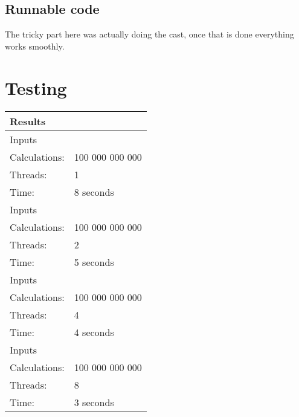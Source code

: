 

\subsection{Runnable code}
The tricky part here was actually doing the cast, once that is done everything works smoothly.




\section{Testing}



\newcommand{\rowhead}[1] {
\multicolumn{2}{l}{#1}\\
\hline
}

\newcommand{\row}[3] {
\hline
\rowcolor{gr1}
Inputs&\\
\hline \hline
\rowcolor{gr2}
Calculations: & #1 \\
\hline
\rowcolor{gr2}
Threads: & #2 \\
\hline
\rowcolor{gr2}
Time: & #3 \\
\hline \hline
}

\newcommand{\botrow}[3] {
\hline
\rowcolor{gr1}
Inputs&\\
\hline \hline
\rowcolor{gr2}
N = & #1 \\
\hline
\rowcolor{gr2}
Threads: & #2 \\
\hline
\rowcolor{gr2}
Time: & #3 \\
\hline
}

\begin{table}[ht]
\begin{tabular}{| p{} | p{} |}
\rowhead{Results}
\row{100 000 000 000}{1}{8 seconds}
\row{100 000 000 000}{2}{5 seconds}
\row{100 000 000 000}{4}{4 seconds}
\row{100 000 000 000}{8}{3 seconds}
\end{tabular}
\end{table}